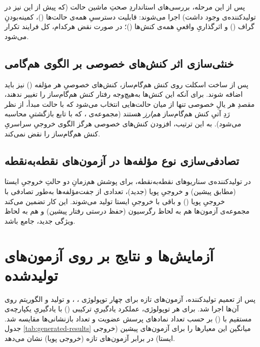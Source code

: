 \documentclass[a4paper,12pt]{article}
\numberwithin{algorithm}{section}
\begin{document}
پس از این مرحله، بررسی‌های استانداردِ صحتِ ماشین حالت (که پیش از این نیز در تولیدکننده‌ی  وجود داشت) اجرا می‌شوند: قابلیت دسترسیِ همه‌ی حالت‌ها ()، کمینه‌بودنِ گراف () و اثرگذاریِ واقعیِ همه‌ی کنش‌ها ()؛ در صورت نقض هرکدام، کل فرایند تکرار می‌شود.

\subsection{خنثی‌سازی اثر کنش‌های خصوصی بر الگوی هم‌گامی}
پس از ساخت اسکلت روی کنش هم‌گام‌ساز، کنش‌های خصوصیِ هر مؤلفه () نیز باید اضافه شوند. برای آنکه این کنش‌ها به‌هیچ‌وجه رفتار کنش هم‌گام‌ساز را تغییر ندهند، مقصدِ هر یالِ خصوصی تنها از میان حالت‌هایی انتخاب می‌شود که با حالت مبدأ، از نظر رَدِ آتیِ کنش هم‌گام‌ساز \emph{هم‌ارز} هستند (مجموعه‌ی ، که با تابع بازگشتیِ  محاسبه می‌شود). به این ترتیب، افزودن کنش‌های خصوصی هرگز الگوی خروجیِ سراسریِ کنش هم‌گام‌ساز را نقض نمی‌کند.

\subsection{تصادفی‌سازی نوع مؤلفه‌ها در آزمون‌های نقطه‌به‌نقطه}
در تولیدکننده‌ی سناریوهای نقطه‌به‌نقطه، برای پوشش هم‌زمانِ دو حالتِ خروجیِ ایستا (مطابق  پیشین) و خروجیِ پویا (جدید)، تعدادی از جفت‌مؤلفه‌ها به‌طور تصادفی با خروجیِ پویا () و باقی با خروجیِ ایستا تولید می‌شوند. این کار تضمین می‌کند مجموعه‌ی آزمون‌ها هم به لحاظ رگرسیون (حفظ درستی رفتار پیشین) و هم به لحاظ ویژگی جدید، جامع باشد.

\section{آزمایش‌ها و نتایج بر روی آزمون‌های تولیدشده}\label{sec:results-generated}
پس از تعمیم تولیدکننده، آزمون‌های تازه برای چهار توپولوژی ، ،  و  تولید و الگوریتم  روی آن‌ها اجرا شد. برای هر توپولوژی، عملکرد یادگیریِ ترکیبی () با یادگیریِ یکپارچه‌ی مستقیم با  () بر حسب تعداد نمادهای پرسش عضویت و تعداد بازنشانی‌ها مقایسه شد. جدول \ref{tab:generated-results} میانگین این معیارها را برای آزمون‌های پیشین (خروجی ایستا) در برابر آزمون‌های تازه (خروجی پویا) نشان می‌دهد.
\end{document}
